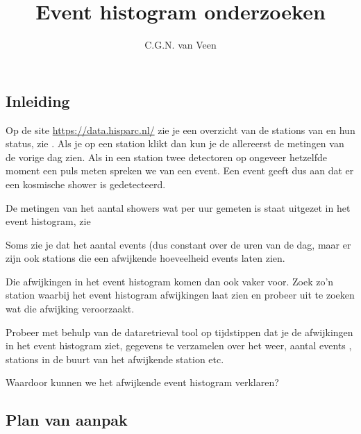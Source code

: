 


\title{Event histogram onderzoeken}
\author{C.G.N. van Veen}



\maketitle

\begin{questions}

\begin{EnvUplevel}
\section{Inleiding}

Op de site \url{https://data.hisparc.nl/} zie je een overzicht van de
stations van \hisparc en hun status, zie . Als
je op een station klikt dan kun je de allereerst de metingen van de
vorige dag zien. Als in een station twee detectoren op ongeveer
hetzelfde moment een puls meten spreken we van een event. Een event
geeft dus aan dat er een kosmische shower is gedetecteerd.

De metingen van het aantal showers wat per uur gemeten is staat uitgezet
in het event histogram, zie 

Soms zie je dat het aantal events (dus  constant over de uren van de dag,
maar er zijn ook stations die een afwijkende hoeveelheid events laten
zien.

Die afwijkingen in het event histogram komen dan ook vaker
voor. Zoek zo'n station waarbij het event histogram afwijkingen laat
zien en probeer uit te zoeken wat die afwijking veroorzaakt.

Probeer met behulp van de dataretrieval tool op tijdstippen dat
je de afwijkingen in het event histogram ziet, gegevens te verzamelen
over het weer, aantal events , stations in de buurt van het afwijkende
station etc.
\end{EnvUplevel}

\question Waardoor kunnen we het afwijkende event histogram verklaren?


\begin{EnvUplevel}
\section{Plan van aanpak}


\end{EnvUplevel}
\end{questions}
